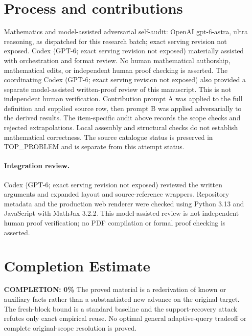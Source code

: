 \documentclass[11pt]{article}
\begin{document}
\section{Process and contributions}
Mathematics and model-assisted adversarial self-audit: OpenAI gpt-6-astra, ultra reasoning, as dispatched for this research batch; exact serving revision not exposed. Codex (GPT-6; exact serving revision not exposed) materially assisted with orchestration and format review. No human mathematical authorship, mathematical edits, or independent human proof checking is asserted.
The coordinating Codex (GPT-6; exact serving revision not exposed) also provided a separate model-assisted written-proof review of this manuscript. This is not independent human verification.
Contribution prompt A was applied to the full definition and supplied source row, then prompt B was applied adversarially to the derived results. The item-specific audit above records the scope checks and rejected extrapolations. Local assembly and structural checks do not establish mathematical correctness. The source catalogue status is preserved in TOP\_PROBLEM and is separate from this attempt status.
\paragraph{Integration review.} Codex (GPT-6; exact serving revision not exposed) reviewed the written arguments and expanded layout and source-reference wrappers. Repository metadata and the production web renderer were checked using Python 3.13 and JavaScript with MathJax 3.2.2. This model-assisted review is not independent human proof verification; no PDF compilation or formal proof checking is asserted.

\section{Completion Estimate}
\noindent\textbf{COMPLETION: 0\%}
The proved material is a rederivation of known or auxiliary facts rather than a substantiated new advance on the original target. The fresh-block bound is a standard baseline and the support-recovery attack refutes only exact empirical reuse. No optimal general adaptive-query tradeoff or complete original-scope resolution is proved.
\end{document}
